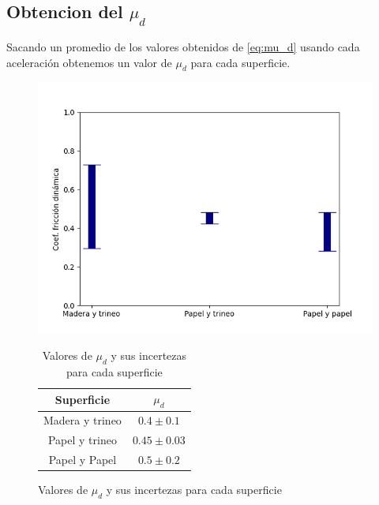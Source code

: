 \documentclass[12pt,a4]{article}
\begin{document}
\subsection{Obtencion del $\mu_d$}

Sacando un promedio de los valores obtenidos de \ref{eq:mu_d} usando cada aceleración obtenemos un valor de $\mu_d$ para cada superficie.

\begin{figure}[H]
    \begin{minipage}{0.5\textwidth}
        \centering
        \includegraphics[width=0.9\linewidth]{ud_Combined.png}
        \caption{Promedio de $\mu_d$ para cada superficie}
        \label{fig:mu_d promedio}
    \end{minipage}\hfill
    \begin{minipage}{0.5\textwidth}
        \centering
        \begin{table}[H]
            \centering
            \begin{tabular}{|c|c|}
                \hline
                \textbf{Superficie} & \textbf{$\mu_d$}\\
                \hline
                Madera y trineo & $0.4 \pm 0.1$\\
                Papel y trineo & $0.45 \pm 0.03$ \\
                Papel y Papel & $0.5 \pm 0.2$ \\
                \hline
            \end{tabular}
            \caption{Valores de $\mu_d$ y sus incertezas para cada superficie}
            \label{tab:mu_d}
        \end{table}
    \end{minipage}
\end{figure}
\end{document}
